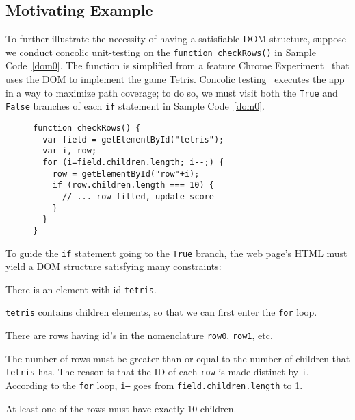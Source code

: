\subsection{Motivating Example}
To further illustrate the necessity of having a satisfiable DOM structure, suppose we conduct concolic unit-testing on the {\tt function checkRows()} in Sample Code~\ref{dom0}.  
The function is simplified from a feature Chrome Experiment~\cite{domtris} that uses the DOM to implement the game Tetris.  
Concolic testing~\cite{cute} executes the app in a way to maximize path coverage; to do so, we must visit both the {\tt True} and {\tt False} branches of each {\tt if} statement in Sample Code~\ref{dom0}.  
\begin{figure}
\begin{lstlisting}[caption=Example code whose tests and execution depend on the Document Object Model having a precise tree structure. {\tt getElementById()} is equivalent to {\tt document.getElementById()}.,label=dom0]
function checkRows() {
  var field = getElementById("tetris"); 
  var i, row;
  for (i=field.children.length; i--;) {
    row = getElementById("row"+i);
    if (row.children.length === 10) {
      // ... row filled, update score
    }
  }
}
\end{lstlisting}
\end{figure}

To guide the {\tt if} statement going to the {\tt True} branch, the web page's HTML must yield a DOM structure satisfying many constraints:
\begin {compactitem}
\item There is an element with id {\tt tetris}.
\item {\tt tetris} contains children elements, so that we can first enter the {\tt for} loop.
\item There are rows having id's in the nomenclature {\tt row0}, {\tt row1}, etc.
\item The number of rows must be greater than or equal to the number of children that {\tt tetris} has.  The reason is that the ID of each {\tt row} is made distinct by {\tt i}.  According to the {\tt for} loop, {\tt i---} goes from {\tt field.children.length} to 1.
\item At least one of the rows must have exactly 10 children.
\end {compactitem}

